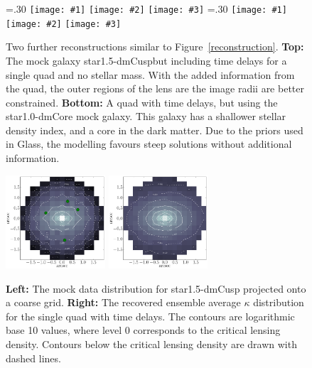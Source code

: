 \documentclass[galley,usenatbib]{mn2e}
\newcommand{\Glass}{{\sc Glass}}
\newcommand{\figref}[1] {Figure~\ref{#1}}
\newcommand{\mockAA}{{\sc star1.0-dmCore}}
\newcommand{\mockBC}{{\sc star1.5-dmCusp}}
\newcommand\plotthree[3]{{%
 \centering
 \leavevmode
 \columnwidth=.30\textwidth
 \texttt{[image: \#1]}%
 \hfil
 \texttt{[image: \#2]}%
 \hfil
 \texttt{[image: \#3]}%
}}%
\begin{document}
\begin{figure}
  \plotthree{BCQuadR1a_Tms-a.pdf} {BCQuadR1a_Tms-b.pdf} {BCQuadR1a_Tms-c.pdf}
  \plotthree{AAQuadR1a_Tms-a.pdf} {AAQuadR1a_Tms-b.pdf} {AAQuadR1a_Tms-c.pdf}
\caption{
    Two further reconstructions similar to \figref{reconstruction}.
    \textbf{Top:} The mock galaxy \mockBC but including time delays for a
    single quad and no stellar mass. With the added information from the quad,
    the outer regions of the lens are the image radii are better constrained.
    \textbf{Bottom:} A quad with time delays, but using the \mockAA{} mock
    galaxy. This galaxy has a shallower stellar density index, and a core in
    the dark matter. Due to the priors used in \Glass, the modelling favours
    steep solutions without additional information.
}
\label{reconstruction 2}
\end{figure}

\begin{figure}
\includegraphics[width=0.33\textwidth]{BCQuadR1a_TmS-kappa-a.pdf}
\includegraphics[width=0.33\textwidth]{BCQuadR1a_TmS-kappa-b.pdf}
\caption{ \textbf{Left:} The mock data distribution for \mockBC{} projected
onto a coarse grid.  \textbf{Right:} The recovered ensemble average $\kappa$
distribution for the single quad with time delays. The contours are logarithmic
base 10 values, where level 0 corresponds to the critical lensing density. Contours
below the critical lensing density are drawn with dashed lines.}
\label{2d mass reconstruction}
\end{figure}
\end{document}
